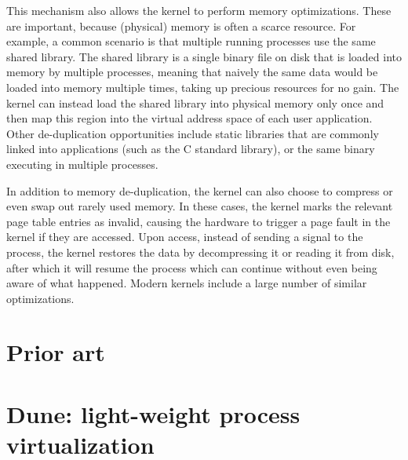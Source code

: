 This mechanism also allows the kernel to perform memory optimizations. These are important, because (physical) memory is often a scarce resource. For example, a common scenario is that multiple running processes use the same shared library. The shared library is a single binary file on disk that is loaded into memory by multiple processes, meaning that naively the same data would be loaded into memory multiple times, taking up precious resources for no gain. The kernel can instead load the shared library into physical memory only once and then map this region into the virtual address space of each user application. Other de-duplication opportunities include static libraries that are commonly linked into applications (such as the C standard library), or the same binary executing in multiple processes.

In addition to memory de-duplication, the kernel can also choose to compress or even swap out rarely used memory. In these cases, the kernel marks the relevant page table entries as invalid, causing the hardware to trigger a page fault in the kernel if they are accessed. Upon access, instead of sending a signal to the process, the kernel restores the data by decompressing it or reading it from disk, after which it will resume the process which can continue without even being aware of what happened. Modern kernels include a large number of similar optimizations. 


\section{Prior art}


\section{Dune: light-weight process virtualization}

